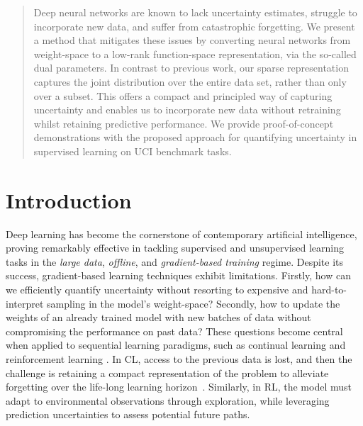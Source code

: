 \documentclass{article}
\begin{document}
\begin{abstract}
Deep neural networks are known to lack uncertainty estimates, struggle to incorporate new data, and suffer from catastrophic forgetting. We present a method that mitigates these issues by converting neural networks from weight-space to a low-rank function-space representation, via the so-called dual parameters. In contrast to previous work, our sparse representation captures the joint distribution over the entire data set, rather than only over a subset. This offers a compact and principled way of capturing uncertainty and enables us to incorporate new data without retraining whilst retaining predictive performance. We provide proof-of-concept demonstrations with the proposed approach for quantifying uncertainty in supervised learning on UCI benchmark tasks.
\end{abstract}

\section{Introduction}
%
Deep learning \citep{goodfellow2016deep} has become the cornerstone of contemporary artificial intelligence, proving remarkably effective in tackling supervised and unsupervised learning tasks in the {\em large data}, {\em offline}, and {\em gradient-based training} regime. Despite its success, gradient-based learning techniques exhibit limitations. Firstly, how can we efficiently quantify uncertainty without resorting to expensive and hard-to-interpret sampling in the model's weight-space? Secondly, how to update the weights of an already trained model with new batches of data without compromising the performance on past data? These questions become central when applied to sequential learning paradigms, such as continual learning \citep[CL,][]{parisi2019continual, de2021continual} and reinforcement learning  \citep[RL,][]{sutton2018reinforcement}. In CL, access to the previous data is lost, and then the challenge is retaining a compact representation of the problem to alleviate forgetting over the life-long learning horizon~\citep{mccloskey1989catastrophic}. Similarly, in RL, the model must adapt to environmental observations through exploration, while leveraging prediction uncertainties to assess potential future paths.
\end{document}
